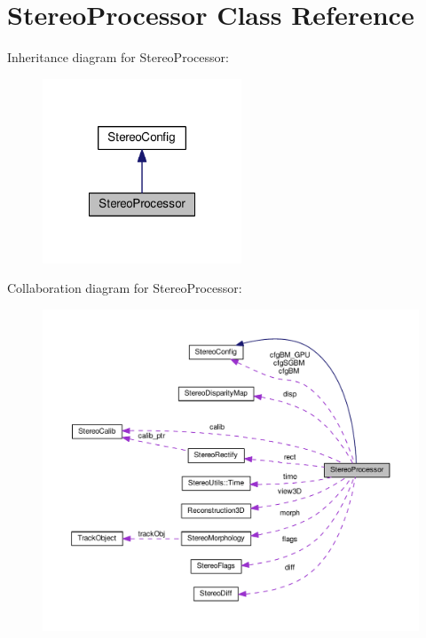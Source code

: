 \hypertarget{class_stereo_processor}{}\section{Stereo\+Processor Class Reference}
\label{class_stereo_processor}


Inheritance diagram for Stereo\+Processor\+:
\nopagebreak
\begin{figure}[H]
\begin{center}
\leavevmode
\includegraphics[width=168pt]{class_stereo_processor__inherit__graph}
\end{center}
\end{figure}


Collaboration diagram for Stereo\+Processor\+:
\nopagebreak
\begin{figure}[H]
\begin{center}
\leavevmode
\includegraphics[width=350pt]{class_stereo_processor__coll__graph}
\end{center}
\end{figure}
